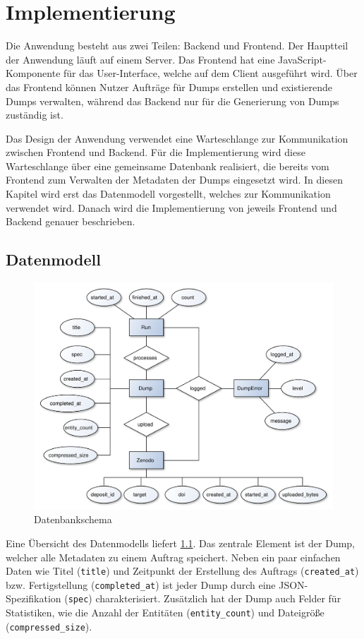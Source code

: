 \chapter{Implementierung}
\label{chap:implementation}
Die Anwendung besteht aus zwei Teilen: Backend und Frontend.
Der Hauptteil der Anwendung läuft auf einem Server.
Das Frontend hat eine JavaScript-Komponente für das User-Interface, welche auf dem Client ausgeführt wird.
Über das Frontend können Nutzer Aufträge für Dumps erstellen und existierende Dumps verwalten, während das Backend nur für die Generierung von Dumps zuständig ist.

Das Design der Anwendung verwendet eine Warteschlange zur Kommunikation zwischen Frontend und Backend.
Für die Implementierung wird diese Warteschlange über eine gemeinsame Datenbank realisiert, die bereits vom Frontend zum Verwalten der Metadaten der Dumps eingesetzt wird.
In diesen Kapitel wird erst das Datenmodell vorgestellt, welches zur Kommunikation verwendet wird.
Danach wird die Implementierung von jeweils Frontend und Backend genauer beschrieben.

\section{Datenmodell}
\begin{figure}
  \includegraphics[width=\textwidth]{pics/db-er}
  \caption{Datenbankschema}
  \label{fig:db-er}
\end{figure}
Eine Übersicht des Datenmodells liefert \cref{fig:db-er}.
Das zentrale Element ist der Dump, welcher alle Metadaten zu einem Auftrag speichert.
Neben ein paar einfachen Daten wie Titel (\verb|title|) und Zeitpunkt der Erstellung des Auftrags (\verb|created_at|) bzw. Fertigstellung (\verb|completed_at|) ist jeder Dump durch eine JSON-Spezifikation (\verb|spec|) charakterisiert. Zusätzlich hat der Dump auch Felder für Statistiken, wie die Anzahl der Entitäten (\verb|entity_count|) und Dateigröße (\verb|compressed_size|).

